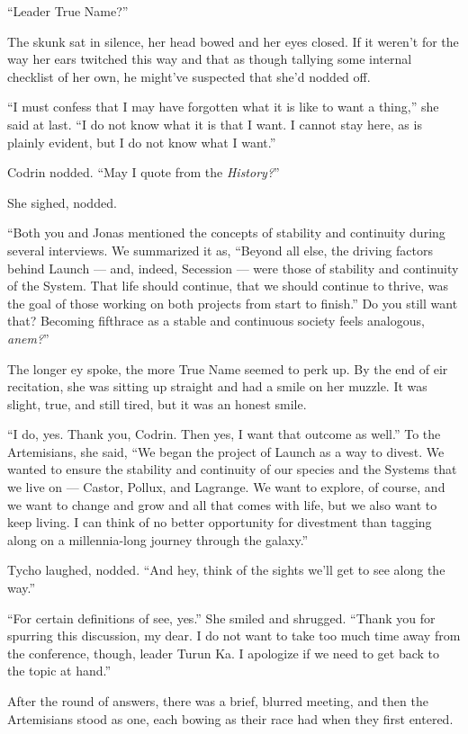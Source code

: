 ``Leader True Name?''

The skunk sat in silence, her head bowed and her eyes closed. If it weren't for the way her ears twitched this way and that as though tallying some internal checklist of her own, he might've suspected that she'd nodded off.

``I must confess that I may have forgotten what it is like to want a thing,'' she said at last. ``I do not know what it is that I want. I cannot stay here, as is plainly evident, but I do not know what I want.''

Codrin nodded. ``May I quote from the \emph{History?}''

She sighed, nodded.

``Both you and Jonas mentioned the concepts of stability and continuity during several interviews. We summarized it as, ``Beyond all else, the driving factors behind Launch — and, indeed, Secession — were those of stability and continuity of the System. That life should continue, that we should continue to thrive, was the goal of those working on both projects from start to finish.'' Do you still want that? Becoming fifthrace as a stable and continuous society feels analogous, \emph{anem?}''

The longer ey spoke, the more True Name seemed to perk up. By the end of eir recitation, she was sitting up straight and had a smile on her muzzle. It was slight, true, and still tired, but it was an honest smile.

``I do, yes. Thank you, Codrin. Then yes, I want that outcome as well.'' To the Artemisians, she said, ``We began the project of Launch as a way to divest. We wanted to ensure the stability and continuity of our species and the Systems that we live on — Castor, Pollux, and Lagrange. We want to explore, of course, and we want to change and grow and all that comes with life, but we also want to keep living. I can think of no better opportunity for divestment than tagging along on a millennia-long journey through the galaxy.''

Tycho laughed, nodded. ``And hey, think of the sights we'll get to see along the way.''

``For certain definitions of see, yes.'' She smiled and shrugged. ``Thank you for spurring this discussion, my dear. I do not want to take too much time away from the conference, though, leader Turun Ka. I apologize if we need to get back to the topic at hand.''

After the round of answers, there was a brief, blurred meeting, and then the Artemisians stood as one, each bowing as their race had when they first entered.

